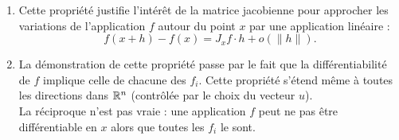 
\remarks
\begin{enumerate}
  \item Cette propriété justifie l'intérêt de la matrice jacobienne pour approcher les variations de l'application $f$ autour du point $x$ par une application linéaire : 
  $$
  f(x+h) - f(x) = J_xf \cdot h + o(\|h\|).
  $$
  \item La démonstration de cette propriété passe par le fait que la différentiabilité de $f$ implique celle de chacune des $f_i$. Cette propriété s'étend même à toutes les directions dans $\mathbb{R}^n$ (contrôlée par le choix du vecteur $u$). \\
  La réciproque n'est pas vraie : une application $f$ peut ne pas être différentiable en $x$ alors que toutes les $f_i$ le sont.
\end{enumerate}
